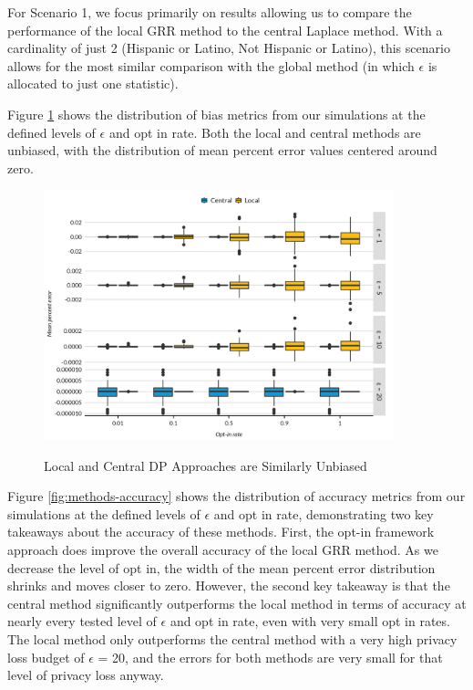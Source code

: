 \documentclass[
]{urban-formatting}
\begin{document}
For Scenario 1, we focus primarily on results allowing us to compare the
performance of the local GRR method to the central Laplace method. With
a cardinality of just 2 (Hispanic or Latino, Not Hispanic or Latino),
this scenario allows for the most similar comparison with the global
method (in which \(\epsilon\) is allocated to just one statistic).

Figure \ref{fig:methods-bias} shows the distribution of bias metrics
from our simulations at the defined levels of \(\epsilon\) and opt in
rate. Both the local and central methods are unbiased, with the
distribution of mean percent error values centered around zero.

\begin{figure}[!htb]
    \centering
    \caption{Local and Central DP Approaches are Similarly Unbiased}
    \includegraphics[width=4in]{../figures/methods_bias.png}
    \label{fig:methods-bias}
\end{figure}

Figure \ref{fig:methods-accuracy} shows the distribution of accuracy
metrics from our simulations at the defined levels of \(\epsilon\) and
opt in rate, demonstrating two key takeaways about the accuracy of these
methods. First, the opt-in framework approach does improve the overall
accuracy of the local GRR method. As we decrease the level of opt in,
the width of the mean percent error distribution shrinks and moves
closer to zero. However, the second key takeaway is that the central
method significantly outperforms the local method in terms of accuracy
at nearly every tested level of \(\epsilon\) and opt in rate, even with
very small opt in rates. The local method only outperforms the central
method with a very high privacy loss budget of \(\epsilon\) = 20, and
the errors for both methods are very small for that level of privacy
loss anyway.
\end{document}
